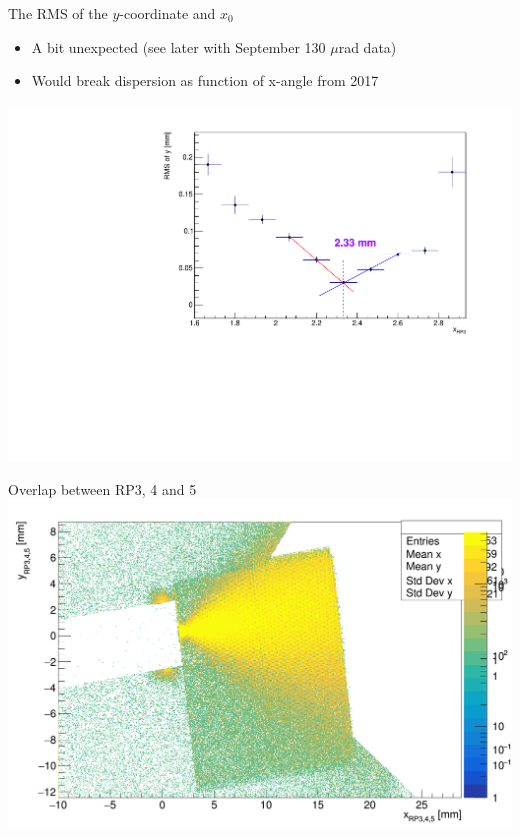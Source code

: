 \documentclass{beamer}
\begin{document}
\begin{frame}\scriptsize
	\begin{block}{The RMS of the $y$-coordinate and $x_{0}$}
    		\begin{itemize}
			\item A bit unexpected (see later with September 130 $\mu$rad data)
			\item Would break dispersion as function of x-angle from 2017
		\end{itemize}
             \includegraphics[width=1.0\textwidth]{160muradRMS.pdf}
	\end{block}
	
\end{frame}

\begin{frame}\scriptsize
	\begin{block}{Overlap between RP3, 4 and 5}
             \includegraphics[width=1.0\textwidth]{overlap.png}
	\end{block}
	
\end{frame}
\end{document}
